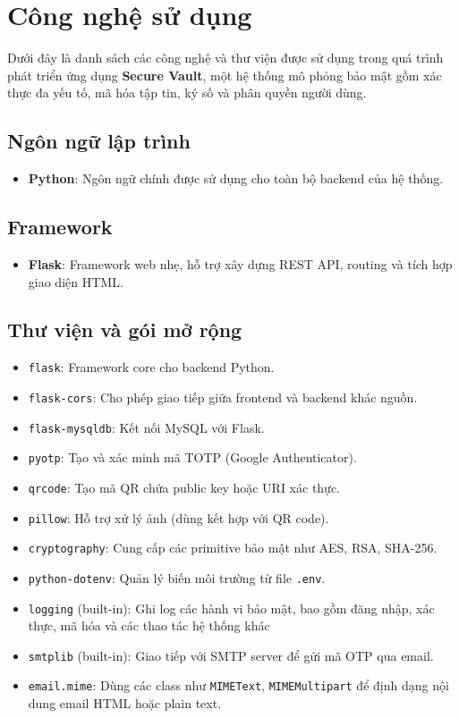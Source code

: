 \newpage
\section{Công nghệ sử dụng}

Dưới đây là danh sách các công nghệ và thư viện được sử dụng trong quá trình phát triển ứng dụng \textbf{Secure Vault}, một hệ thống mô phỏng bảo mật gồm xác thực đa yếu tố, mã hóa tập tin, ký số và phân quyền người dùng.

\subsection{Ngôn ngữ lập trình}
\begin{itemize}
    \item \textbf{Python}: Ngôn ngữ chính được sử dụng cho toàn bộ backend của hệ thống.
\end{itemize}

\subsection{Framework}
\begin{itemize}
    \item \textbf{Flask}: Framework web nhẹ, hỗ trợ xây dựng REST API, routing và tích hợp giao diện HTML.
\end{itemize}

\subsection{Thư viện và gói mở rộng}
\begin{itemize}
    \item \texttt{flask}: Framework core cho backend Python.
    \item \texttt{flask-cors}: Cho phép giao tiếp giữa frontend và backend khác nguồn.
    \item \texttt{flask-mysqldb}: Kết nối MySQL với Flask.
    \item \texttt{pyotp}: Tạo và xác minh mã TOTP (Google Authenticator).
    \item \texttt{qrcode}: Tạo mã QR chứa public key hoặc URI xác thực.
    \item \texttt{pillow}: Hỗ trợ xử lý ảnh (dùng kết hợp với QR code).
    \item \texttt{cryptography}: Cung cấp các primitive bảo mật như AES, RSA, SHA-256.
    \item \texttt{python-dotenv}: Quản lý biến môi trường từ file \texttt{.env}.
    \item \texttt{logging} (built-in): Ghi log các hành vi bảo mật, bao gồm đăng nhập, xác thực, mã hóa và các thao tác hệ thống khác    
    \item \texttt{smtplib} (built-in): Giao tiếp với SMTP server để gửi mã OTP qua email.
    \item \texttt{email.mime}: Dùng các class như \texttt{MIMEText}, \texttt{MIMEMultipart} để định dạng nội dung email HTML hoặc plain text.
\end{itemize}

